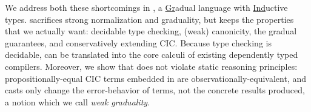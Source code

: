 


We address both these shortcomings in \lang, a \underline{Gr}adual language with \underline{Ind}uctive types.
\lang sacrifices
strong normalization and graduality, but keeps the properties that we actually want: decidable type checking,
(weak) canonicity, the gradual guarantees, and conservatively extending CIC.
Because type checking is decidable, \lang can be translated into the core calculi of existing dependently typed compilers.
Moreover, we show that \lang does not violate static reasoning principles: propositionally-equal
CIC terms embedded in \lang are observationally-equivalent,
and casts only change the error-behavior of terms, not the concrete results produced, a
notion which we call \textit{weak graduality}.

